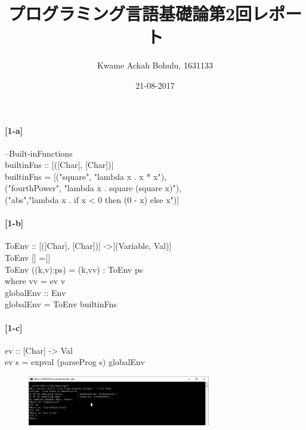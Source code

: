 \documentclass[20 pts]{article}
\title{プログラミング言語基礎論第2回レポート}
\author{Kwame Ackah Bohulu, 1631133}
\date{21-08-2017}
\begin{document}
\maketitle

\newpage

\paragraph{[1-a]}
--Built-inFunctions\\
builtinFns :: [([Char], [Char])]\\
builtinFns = [("square", "lambda x . x * x"),\\
              ("fourthPower", "lambda x . square (square x)"),\\
              ("abs","lambda x . if x < 0 then (0 - x) else x")]\\
              
              
\paragraph{[1-b]}

ToEnv :: [([Char], [Char])] ->[(Variable, Val)]\\
ToEnv [] =[]\\
ToEnv ((k,v):ps) = (k,vv) : ToEnv ps\\
                          where vv = ev v\\

globalEnv :: Env \\
globalEnv = ToEnv builtinFns\\

\paragraph{[1-c]}
ev :: [Char] -> Val\\
ev s = expval (parseProg s) globalEnv

\begin {center}
\begin{figure}[h!]
\includegraphics[width=8cm]{1_b.jpg}
\label{SystemModel}
\end{figure}
\end{center}


    \newpage   
\end{document}
